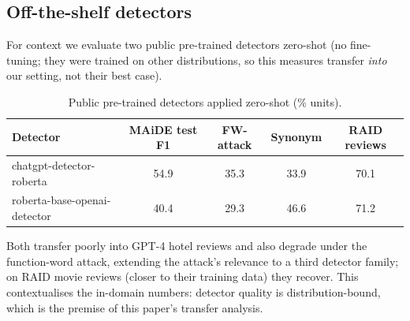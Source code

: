 \documentclass[11pt]{article}
\begin{document}
\subsection{Off-the-shelf detectors}
For context we evaluate two public pre-trained detectors zero-shot (no fine-tuning; they were trained on other distributions, so this measures transfer \emph{into} our setting, not their best case).
\begin{table}[H]\centering
\caption{Public pre-trained detectors applied zero-shot (\% units).}
\label{tab:offshelf}
\small
\begin{tabular}{lcccc}
\toprule
Detector & MAiDE test F1 & FW-attack & Synonym & RAID reviews \\
\midrule
chatgpt-detector-roberta & 54.9 & 35.3 & 33.9 & 70.1 \\
roberta-base-openai-detector & 40.4 & 29.3 & 46.6 & 71.2 \\
\bottomrule
\end{tabular}
\end{table}
Both transfer poorly into GPT-4 hotel reviews and also degrade under the function-word attack, extending the attack's relevance to a third detector family; on RAID movie reviews (closer to their training data) they recover. This contextualises the in-domain numbers: detector quality is distribution-bound, which is the premise of this paper's transfer analysis.
\end{document}
